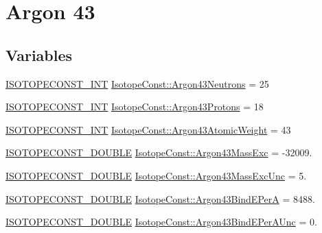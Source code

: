 \hypertarget{group___isotope_const-_argon-_ar43}{}\section{Argon 43}
\label{group___isotope_const-_argon-_ar43}
\subsection*{Variables}
\begin{DoxyCompactItemize}
\item 
\mbox{\hyperlink{group___isotope_const-_macros_ga5f18360b3e99483a35c32d789e62621c}{I\+S\+O\+T\+O\+P\+E\+C\+O\+N\+S\+T\+\_\+\+I\+NT}} \mbox{\hyperlink{group___isotope_const-_argon-_ar43_gafccccfe3373efc0a4931fcaf1952bd51}{Isotope\+Const\+::\+Argon43\+Neutrons}} = 25
\item 
\mbox{\hyperlink{group___isotope_const-_macros_ga5f18360b3e99483a35c32d789e62621c}{I\+S\+O\+T\+O\+P\+E\+C\+O\+N\+S\+T\+\_\+\+I\+NT}} \mbox{\hyperlink{group___isotope_const-_argon-_ar43_gab367f35fd63d72019cb59cc0e25ee6e1}{Isotope\+Const\+::\+Argon43\+Protons}} = 18
\item 
\mbox{\hyperlink{group___isotope_const-_macros_ga5f18360b3e99483a35c32d789e62621c}{I\+S\+O\+T\+O\+P\+E\+C\+O\+N\+S\+T\+\_\+\+I\+NT}} \mbox{\hyperlink{group___isotope_const-_argon-_ar43_ga5c31d6526bb81b93e9b87506994a016f}{Isotope\+Const\+::\+Argon43\+Atomic\+Weight}} = 43
\item 
\mbox{\hyperlink{group___isotope_const-_macros_ga8f45a7272ce02c0b4c65c44636ed719a}{I\+S\+O\+T\+O\+P\+E\+C\+O\+N\+S\+T\+\_\+\+D\+O\+U\+B\+LE}} \mbox{\hyperlink{group___isotope_const-_argon-_ar43_gaf3342699016a54bfa93bdd1a33b09a8a}{Isotope\+Const\+::\+Argon43\+Mass\+Exc}} = -\/32009.
\item 
\mbox{\hyperlink{group___isotope_const-_macros_ga8f45a7272ce02c0b4c65c44636ed719a}{I\+S\+O\+T\+O\+P\+E\+C\+O\+N\+S\+T\+\_\+\+D\+O\+U\+B\+LE}} \mbox{\hyperlink{group___isotope_const-_argon-_ar43_ga63bd2bfee94919cf090b193d161319c0}{Isotope\+Const\+::\+Argon43\+Mass\+Exc\+Unc}} = 5.
\item 
\mbox{\hyperlink{group___isotope_const-_macros_ga8f45a7272ce02c0b4c65c44636ed719a}{I\+S\+O\+T\+O\+P\+E\+C\+O\+N\+S\+T\+\_\+\+D\+O\+U\+B\+LE}} \mbox{\hyperlink{group___isotope_const-_argon-_ar43_ga7ffd9733df4b15370143ac648f9e6955}{Isotope\+Const\+::\+Argon43\+Bind\+E\+PerA}} = 8488.
\item 
\mbox{\hyperlink{group___isotope_const-_macros_ga8f45a7272ce02c0b4c65c44636ed719a}{I\+S\+O\+T\+O\+P\+E\+C\+O\+N\+S\+T\+\_\+\+D\+O\+U\+B\+LE}} \mbox{\hyperlink{group___isotope_const-_argon-_ar43_ga26b04d81909a8d983ece7129d3bb67bd}{Isotope\+Const\+::\+Argon43\+Bind\+E\+Per\+A\+Unc}} = 0.

\end{DoxyCompactItemize}
